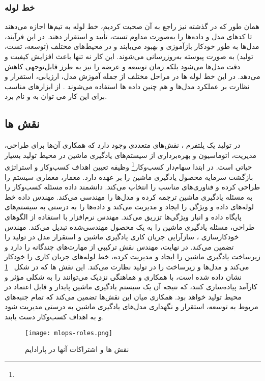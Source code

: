 \subsubsection{خط لوله }
همان طور که در گذشته نیز راجع به آن صحبت کردیم، خط لوله  به تیم‌ها اجازه می‌دهند تا کدهای مدل و داده‌ها را به‌صورت مداوم تست، تأیید و استقرار دهند. در این فرآیند، مدل‌ها به طور خودکار بازآموزی و بهبود می‌یابند و در محیط‌های مختلف (توسعه، تست، تولید) به صورت پیوسته به‌روزرسانی می‌شوند. این کار نه تنها باعث افزایش کیفیت و دقت مدل‌ها می‌شود بلکه زمان توسعه و عرضه را نیز به طرز قابل‌توجهی کاهش می‌دهد. در  این خط لوله ‌ها در مراحل مختلف از جمله آموزش مدل، ارزیابی، استقرار و نظارت بر عملکرد مدل‌ها و هم چنین داده ها استفاده می‌شوند \cite{MLOpsProd2}. از ابزارهای مناسب برای این کار می توان به \cite{Jenkins} و \cite{GitLab} نام برد. 

\subsection{نقش ها}
در تولید یک پلتفرم ، نقش‌های متعددی وجود دارد که همکاری آن‌ها برای طراحی، مدیریت، اتوماسیون و بهره‌برداری از سیستم‌های یادگیری ماشین در محیط تولید بسیار حیاتی است. در ابتدا سهام‌دار کسب‌وکار\footnote{} وظیفه تعیین اهداف کسب‌وکار و استراتژی بازگشت سرمایه محصول یادگیری ماشین را بر عهده دارد. معمار، معماری سیستم را طراحی کرده و فناوری‌های مناسب را انتخاب می‌کند. دانشمند داده مسئله کسب‌وکار را به مسئله یادگیری ماشین ترجمه کرده و مدل‌ها را مهندسی می‌کند. مهندس داده خط لوله‌های داده و ویژگی را ایجاد و مدیریت می‌کند و داده‌ها را به درستی به سیستم‌های پایگاه داده و انبار ویژگی‌ها تزریق می‌کند. مهندس نرم‌افزار با استفاده از الگوهای طراحی، مسئله یادگیری ماشین را به یک محصول مهندسی‌شده تبدیل می‌کند. مهندس  خودکارسازی ، سازآرایی جریان کاری یادگیری ماشین و استقرار مدل در تولید را تضمین می‌کند. در نهایت، مهندس  نقش ترکیبی از مهارت‌های چندگانه را دارد و زیرساخت یادگیری ماشین را ایجاد و مدیریت کرده، خط لوله‌های جریان کاری را خودکار می‌کند و مدل‌ها و زیرساخت را در تولید نظارت می‌کند.  این نقش ها که در شکل 
~\ref{fig: mlops roles}
نشان داده شده است، با همکاری و هماهنگی نزدیک می‌توانند  را به شکلی مؤثر و کارآمد پیاده‌سازی کنند، که نتیجه آن یک سیستم یادگیری ماشین پایدار و قابل اعتماد در محیط تولید خواهد بود. همکاری میان این نقش‌ها تضمین می‌کند که تمام جنبه‌های مربوط به توسعه، استقرار و نگهداری مدل‌های یادگیری ماشین به درستی مدیریت شود و به اهداف کسب‌وکار دست یابند.
\begin{figure}[t]
	\centering
	\texttt{[image: mlops-roles.png]}
	\caption{نقش ها و اشتراکات آنها در پارادایم }
	\label{fig: mlops roles}
\end{figure}

